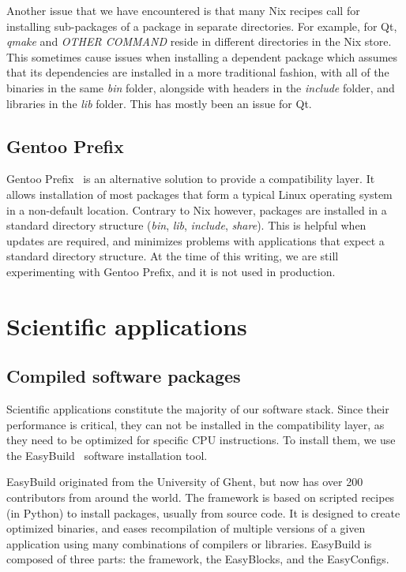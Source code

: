 \documentclass[sigconf]{acmart}
\begin{document}
Another issue that we have encountered is that many Nix recipes call for installing sub-packages of a package in separate directories. For example, for Qt, {\it qmake} and {\it OTHER COMMAND} reside in different directories in the Nix store. This sometimes cause issues when installing a dependent package which assumes that its dependencies are installed in a more traditional fashion, with all of the binaries in the same {\it bin} folder, alongside with headers in the {\it include} folder, and libraries in the {\it lib} folder. This has mostly been an issue for Qt. 


\subsection{Gentoo Prefix}
\label{sub:Gentoo_Prefix}
Gentoo Prefix~\cite{Gentoo} is an alternative solution to provide a compatibility layer. It allows installation of most packages that form a typical Linux operating system in a non-default location. Contrary to Nix however, packages are installed in a standard directory structure ({\it bin}, {\it lib}, {\it include}, {\it share}). This is helpful when updates are required, and minimizes problems with applications that expect a standard directory structure. At the time of this writing, we are still experimenting with Gentoo Prefix, and it is not used in production. 

\section{Scientific applications}
\label{sec:Scientific_applications}

\subsection{Compiled software packages}
\label{sub:Compiled_software_packages}
Scientific applications constitute the majority of our software stack. Since their performance is critical, they can not be installed in the compatibility layer, as they need to be optimized for specific CPU instructions. To install them, we use the EasyBuild~\cite{EasyBuild2012,EasyBuild2014,EasyBuild2016} software installation tool.

EasyBuild originated from the University of Ghent, but now has over 200 contributors from around the world. The framework is based on scripted recipes (in Python) to install packages, usually from source code. It is designed to create optimized binaries, and eases recompilation of multiple versions of a given application using many combinations of compilers or libraries. EasyBuild is composed of three parts: the framework, the EasyBlocks, and the EasyConfigs. 
\end{document}
